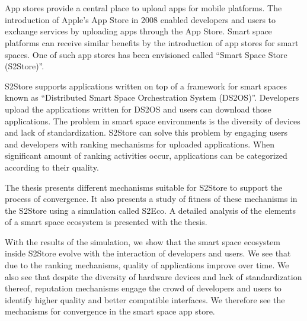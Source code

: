 \chapter{\abstractname}

App stores provide a central place to upload apps for mobile platforms. The introduction of Apple's App Store in 2008 enabled developers and users to exchange services by uploading apps through the App Store. Smart space platforms can receive similar benefits by the introduction of app stores for smart spaces. One of such app stores has been envisioned called ``Smart Space Store (S2Store)''. 

S2Store supports applications written on top of a framework for smart spaces known as ``Distributed Smart Space Orchestration System (DS2OS)''. Developers upload the applications written for DS2OS and users can download those applications. The problem in smart space environments is the diversity of devices and lack of standardization. S2Store can solve this problem by engaging users and developers with ranking mechanisms for uploaded applications. When significant amount of ranking activities occur, applications can be categorized according to their quality.

The thesis presents different mechanisms suitable for S2Store to support the process of convergence. It also presents a study of fitness of these mechanisms in the S2Store using a simulation called S2Eco. A detailed analysis of the elements of a smart space ecosystem is presented with the thesis.

With the results of the simulation, we show that the smart space ecosystem inside S2Store evolve with the interaction of developers and users. We see that due to the ranking mechanisms, quality of applications improve over time. We also see that despite the diversity of hardware devices and lack of standardization thereof, reputation mechanisms engage the crowd of developers and users to identify higher quality and better compatible interfaces. We therefore see the mechanisms for convergence in the smart space app store.

